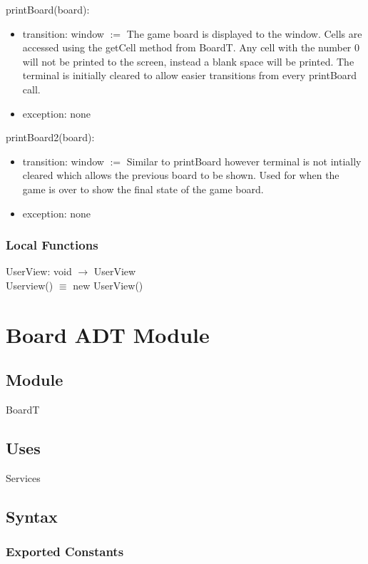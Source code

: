 \documentclass[12pt]{article}
\begin{document}
\noindent printBoard(board): 
\begin{itemize}
    \item transition: window $:=$ The game board is displayed to the window. Cells are accessed using the getCell method from BoardT. Any cell with the number 0 will not be printed to the screen, instead a blank space will be printed. The terminal is initially cleared to allow easier transitions from every printBoard call.
    \item exception: none
\end{itemize}

\noindent printBoard2(board): 
\begin{itemize}
    \item transition: window $:=$ Similar to printBoard however terminal is not intially cleared which allows the previous board to be shown. Used for when the game is over to show the final state of the game board.
    \item exception: none
\end{itemize}

\subsubsection* {Local Functions}

UserView: void $\rightarrow$ UserView\\
Userview() $\equiv$ new UserView()

\newpage
\newpage

\section* {Board ADT Module}

\subsection*{Module}

BoardT

\subsection* {Uses}

Services

\subsection* {Syntax}

\subsubsection* {Exported Constants}
\end{document}
